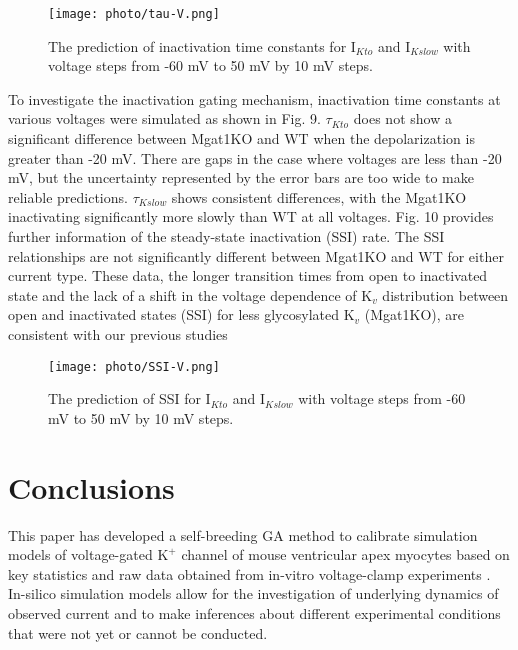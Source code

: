 \documentclass[journal]{IEEEtran}
\begin{document}
\begin{figure}
    \label{fign 9}
    \centering
    \texttt{[image: photo/tau-V.png]}
    \caption{The prediction of inactivation time constants for $\text{I}_{Kto}$ and $\text{I}_{Kslow}$ with voltage steps from -60 mV to 50 mV by 10 mV steps.} 
\end{figure}
To investigate the inactivation gating mechanism, inactivation time constants at various voltages were simulated as shown in Fig. 9. $\tau_{Kto}$ does not show a significant difference between Mgat1KO and WT when the depolarization is greater than -20 mV. There are gaps in the case where voltages are less than -20 mV, but the uncertainty represented by the error bars are too wide to make reliable predictions. $\tau_{Kslow}$ shows consistent differences, with the Mgat1KO inactivating significantly more slowly than WT at all voltages. Fig. 10 provides further information of the steady-state inactivation (SSI) rate. The SSI relationships are not significantly different between Mgat1KO and WT for either current type. These data, the longer transition times from open to inactivated state and the lack of a shift in the voltage dependence of $\text{K}_{v}$ distribution between open and inactivated states (SSI) for less glycosylated $\text{K}_{v}$ (Mgat1KO), are consistent with our previous studies \cite{schwetz2010n, ednie2015reduced, du2017}

\begin{figure}
    \label{fig 10}
    \centering
    \texttt{[image: photo/SSI-V.png]}
    \caption{The prediction of SSI for $\text{I}_{Kto}$ and $\text{I}_{Kslow}$ with voltage steps from -60 mV to 50 mV by 10 mV steps.} 
\end{figure}

\section{Conclusions}
This paper has developed a self-breeding GA method to calibrate simulation models of voltage-gated $\text{K}^{+}$ channel of mouse ventricular apex myocytes based on key statistics and raw data obtained from in-vitro voltage-clamp experiments \cite{ednie2019reduced}. In-silico simulation models allow for the investigation of underlying dynamics of observed current and to make inferences about different experimental conditions that were not yet or cannot be conducted.
\end{document}
